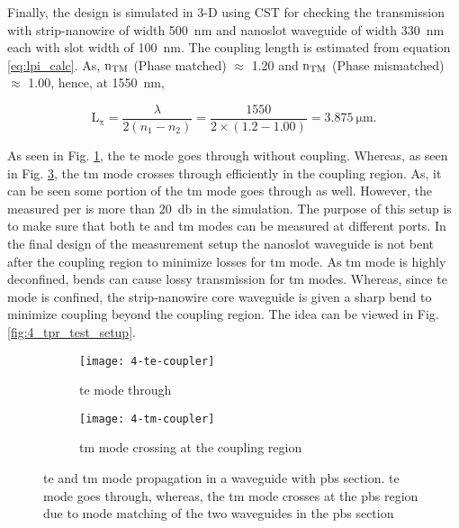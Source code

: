 \documentclass[../report.tex]{subfiles}
\begin{document}
\noindent Finally, the design is simulated in 3-D using CST for checking the transmission with strip-nanowire of width \SI{500}{\nano \meter} and nanoslot waveguide of width \SI{330}{\nano \meter} each with slot width of \SI{100}{\nano \meter}. The coupling length is estimated from equation \ref{eq:lpi_calc}. As, $\mathrm{n_{TM}}$ (Phase matched) $\approx$ 1.20 and $\mathrm{n_{TM}}$ (Phase mismatched) $\approx$ 1.00, hence, at \SI{1550}{\nano \meter},

\begin{equation}\label{eq:lpi_calc_mc}
\mathrm{L_\pi} = \dfrac {\lambda} {2(n_1 - n_2)} = \dfrac {1550} {2\times(1.2 - 1.00)} = \SI{3.875}{\micro \meter}.
\end{equation} 

\noindent As seen in Fig. \ref{fig:4_te_coupler}, the \gls{te} mode goes through without coupling. Whereas, as seen in Fig. \ref{fig:4_tm_coupler}, the \gls{tm} mode crosses through efficiently in the coupling region. As, it can be seen some portion of the \gls{tm} mode goes through as well. However, the measured \gls{per} is more than \SI{20}{\decibel} in the simulation. The purpose of this setup is to make sure that both \gls{te} and \gls{tm} modes can be measured at different ports. In the final design of the measurement setup the nanoslot waveguide is not bent after the coupling region to minimize losses for \gls{tm} mode. As \gls{tm} mode is highly deconfined, bends can cause lossy transmission for \gls{tm} modes. Whereas, since \gls{te} mode is confined, the strip-nanowire core waveguide is given a sharp bend to minimize coupling beyond the coupling region. The idea can be viewed in Fig. \ref{fig:4_tpr_test_setup}.

\begin{figure}[H] %
	\begin{subfigure}[t]{0.45\textwidth}
		\texttt{[image: 4-te-coupler]}
		\caption{\gls{te} mode through}
		\label{fig:4_te_coupler}
	\end{subfigure}
	\hfill
	\begin{subfigure}[t]{0.45\textwidth}
		\texttt{[image: 4-tm-coupler]}
		\caption{\gls{tm} mode crossing at the coupling region}
		\label{fig:4_tm_coupler}
	\end{subfigure}
	\caption{\gls{te} and \gls{tm} mode propagation in a waveguide with \gls{pbs} section. \gls{te} mode goes through, whereas, the \gls{tm} mode crosses at the \gls{pbs} region due to mode matching of the two waveguides in the \gls{pbs} section}
\end{figure}
\end{document}
